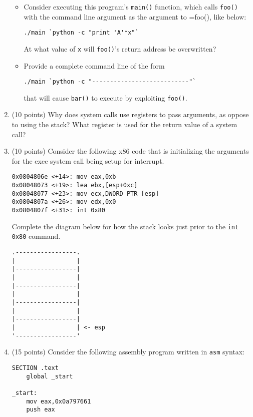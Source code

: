 \documentclass{article}[9pt]
\begin{document}
\begin{enumerate}
\begin{itemize}
\item Consider executing this program's \texttt{main()} function, which
calls \texttt{foo()} with the command line argument as the argument to
=foo(), like below:

\begin{verbatim}
./main `python -c "print 'A'*x"`
\end{verbatim}

At what value of \texttt{x} will \texttt{foo()}'s return address be overwritten?

\item Provide a complete command line of the form 
\begin{verbatim}
./main `python -c "---------------------------"`
\end{verbatim}
that will cause \texttt{bar()} to execute by exploiting \texttt{foo()}.
\end{itemize}

\item (10 points) Why does system calls use registers to pass arguments, as oppose
to using the stack? What register is used for the return value of
a system call?

\item (10 points) Consider the following x86 code that is initializing the
arguments for the exec system call being setup for interrupt.

\begin{verbatim}
0x0804806e <+14>: mov eax,0xb
0x08048073 <+19>: lea ebx,[esp+0xc]
0x08048077 <+23>: mov ecx,DWORD PTR [esp]
0x0804807a <+26>: mov edx,0x0
0x0804807f <+31>: int 0x80
\end{verbatim}

Complete the diagram below for how the stack looks just prior to
the \texttt{int 0x80} command.

\begin{verbatim}
.-----------------.
|                 |
|-----------------|
|                 |
|-----------------|
|                 |
|-----------------|
|                 |
|-----------------|
|                 | <- esp
'-----------------'
\end{verbatim}

\item (15 points) Consider the following assembly program written in \texttt{asm} syntax:
\begin{verbatim}
SECTION .text
    global _start

_start:
    mov eax,0x0a797661
    push eax


\end{verbatim}
\end{enumerate}
\end{document}
